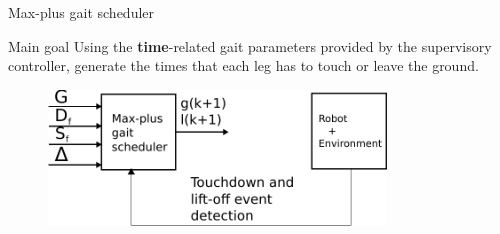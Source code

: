 \documentclass{beamer}
\begin{document}
\begin{frame}{Max-plus gait scheduler}
	\begin{block}{Main goal}
		\Large Using the \textbf{time}-related gait parameters provided by the supervisory controller, generate the times that each leg has to touch or leave the ground.
	\end{block}
	\begin{figure}[ht]\centering
		\includegraphics[width=0.8\textwidth]{images/MaxPlus.pdf}
	\end{figure}
\end{frame}
\end{document}
